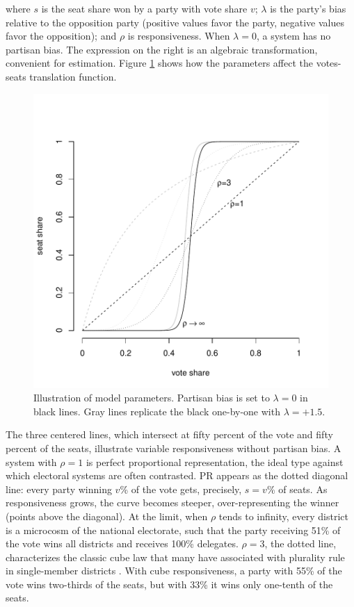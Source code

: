 \documentclass[letter,12pt]{article}
\begin{document}
\noindent where $s$ is the seat share won by a party with vote share $v$; $\lambda$ is the party's bias relative to the opposition party (positive values favor the party, negative values favor the opposition); and $\rho$ is responsiveness. When $\lambda=0$, a system has no partisan bias. The expression on the right is an algebraic transformation, convenient for estimation. Figure \ref{F:lambdaRhoEx} shows how the parameters affect the votes-seats translation function. 


\begin{figure}
\begin{center}
    \includegraphics[width=.55\columnwidth]{rhoExample.pdf} 
\caption{Illustration of model parameters. Partisan bias is set to $\lambda=0$ in black lines. Gray lines replicate the black one-by-one with $\lambda=+1.5$.}\label{F:lambdaRhoEx}
\end{center}
\end{figure}

The three centered lines, which intersect at fifty percent of the vote and fifty percent of the seats, illustrate variable responsiveness without partisan bias. A system with $\rho=1$ is perfect proportional representation, the ideal type against which electoral systems are often contrasted. PR appears as the dotted diagonal line: every party winning $v$\% of the vote gets, precisely, $s=v$\% of seats. As responsiveness grows, the curve becomes steeper, over-representing the winner (points above the diagonal). At the limit, when $\rho$ tends to infinity, every district is a microcosm of the national electorate, such that the party receiving 51\% of the vote wins all districts and receives 100\% delegates. $\rho=3$, the dotted line, characterizes the classic cube law that many have associated with plurality rule in single-member districts \citep{taagepera.CubeLaw.1973}. With cube responsiveness, a party with 55\% of the vote wins two-thirds of the seats, but with 33\% it wins only one-tenth of the seats. 
\end{document}
